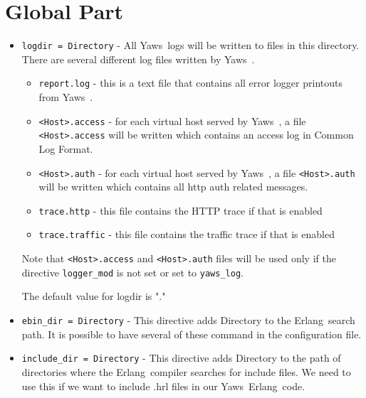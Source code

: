 \documentclass[11pt,oneside,english]{book}
\newcommand{\Erlang}            %
        {{\sc Erlang}}
\newcommand{\Yaws}            %
        {{\sc Yaws}}
\begin{document}
\section{Global Part}

\begin{itemize}


\item       \verb+logdir = Directory+ -
              All \Yaws\  logs will be  written  to  files  in  this
              directory.  There  are  several different log files
              written by \Yaws\ .

              \begin{itemize}
              \item \verb+report.log+ - this is a text file that contains  all
              error logger printouts from \Yaws\ .
              \item \verb+<Host>.access+ - for each virtual host served by \Yaws\ ,
              a file \verb+<Host>.access+ will be written  which  contains
              an access log in Common Log Format.
              \item \verb+<Host>.auth+ - for each virtual host served by
              \Yaws\ , a file \verb+<Host>.auth+ will be written which
              contains all http auth related messages.
              \item \verb+trace.http+  -  this file contains the HTTP trace if
              that is enabled
              \item \verb+trace.traffic+ -  this  file  contains  the  traffic
              trace if that is enabled
              \end{itemize}

              Note that \verb+<Host>.access+ and \verb+<Host>.auth+ files will
              be used only if the directive \verb+logger_mod+ is not set or set
              to \verb+yaws_log+.

              The default value for logdir is "."

\item        \verb+ebin_dir = Directory+ -
              This  directive adds Directory to the \Erlang\  search
              path. It is possible to have several of these  command
              in the configuration file.

\item        \verb+include_dir = Directory+ -
              This directive adds Directory to the path of directories
               where  the  \Erlang\   compiler  searches  for
              include  files.  We  need to use this if we want to
              include .hrl files in our \Yaws\  \Erlang\  code.


\end{itemize}
\end{document}
